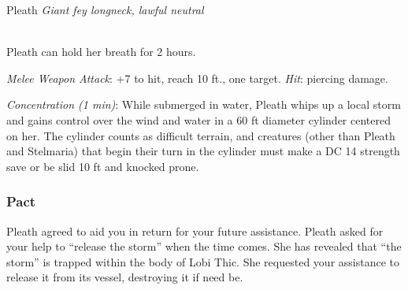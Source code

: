 \documentclass[letterpaper,10pt,twoside,twocolumn,openany]{book}
\begin{document}
\begin{monsterbox}{ Pleath}
	\textit{Giant fey longneck, lawful neutral}\\
	\hline%
	\basics[%
	armorclass = 13 (natural armor),
	hitpoints  = \dice{8d10 + 24},
	speed      = {10 ft., swim 40 ft.}
	]
	\hline%
	\stats[
    STR = \stat{18}, %
    DEX = \stat{15},
    CON = \stat{16},
    INT = \stat{9},
    WIS = \stat{12},
    CHA = \stat{5}
	]
	\hline%
	\details[%
	skills = {Perception + 3, Stealth +5 (when underwater)},
	senses = {pp 13},
	languages = {Longneck, understands Common and Sylvan but cannot speak},
	challenge = 2
	]
	\hline \\[1mm]
	\begin{monsteraction}
		Pleath can hold her breath for 2 hours.
	\end{monsteraction}
	
	\begin{monsteraction}[Bite]
		\emph{Melee Weapon Attack}: +7 to hit, reach 10 ft., one target. \emph{Hit}:  piercing damage.
	\end{monsteraction}
	
	\begin{monsteraction}
		\emph{Concentration (1 min)}: While submerged in water, Pleath whips up a local storm and gains control over the wind and water in a 60 ft diameter cylinder centered on her. The cylinder counts as difficult terrain, and creatures (other than Pleath and Stelmaria) that begin their turn in the cylinder must make a DC 14 strength save or be slid 10 ft and knocked prone.
	\end{monsteraction}

\end{monsterbox}

\subsubsection{Pact}
Pleath agreed to aid you in return for your future assistance.
Pleath asked for your help to ``release the storm'' when the time comes. 
She has revealed that ``the storm'' is trapped within the body of Lobi Thic.
She requested your assistance to release it from its vessel, destroying it if need be.
\end{document}

